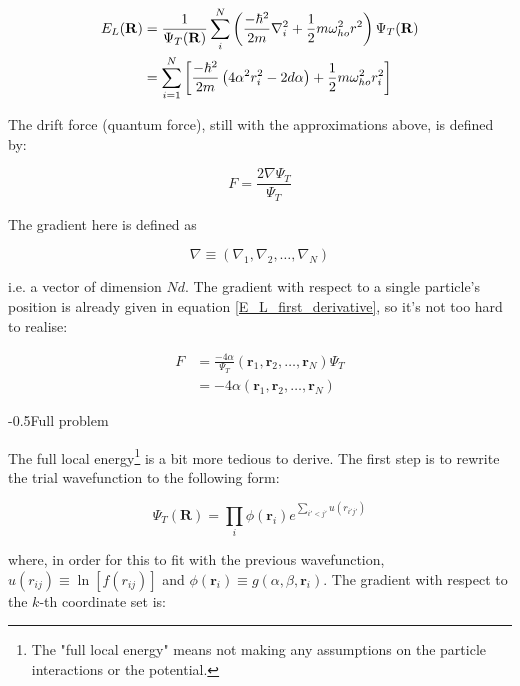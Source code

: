 \documentclass[english, a4paper]{article}
\makeatletter
\newcommand\lr[1]{\left(#1\right)}
\renewcommand{\subsubsection}{\@startsection{subsubsection}{3}{0pt}%
{-\baselineskip}{0.5\baselineskip}{\bf\large}}
\newcommand{\bm}[1]{\mathbf{#1}}
\makeatother
\begin{document}
\begin{align}
\begin{split}
 E_L({\bf R}) &= \frac{1}{\Psi_T({\bf R})}\sum_i^N \lr{
	 \frac{-\hbar^2}{2m}
	 \nabla_{i}^2 +
	\frac{1}{2}m\omega_{ho}^2r^2}\Psi_T({\bf R})\\
    &= \sum_{i=1}^N\left[\frac{-\hbar^2}{2m}\lr{4\alpha^2 r_i^2 - 2d\alpha} + \frac{1}{2}m\omega_{ho}^2r_i^2\right] \label{SimpleLocalEnergies}
\end{split}
\end{align}



The drift force (quantum force), still with the approximations above, is defined by:

\begin{equation}
	F = \frac{2\nabla\Psi_T}{\Psi_T}
\end{equation}

The gradient here is defined as

\begin{equation*}
	\nabla \equiv \lr{\nabla_1,\nabla_2,\ldots,\nabla_N}
\end{equation*}

i.e. a vector of dimension $Nd$. The gradient with respect to a single particle's position is already given in equation \ref{E_L_first_derivative}, so it's not too hard to realise:

\begin{align*}
	F &= \frac{-4\alpha}{\Psi_T}\lr{\bm{r}_1,\bm{r}_2,\ldots,\bm{r}_N}\Psi_T\\
	&= -4\alpha\lr{\bm{r}_1,\bm{r}_2,\ldots,\bm{r}_N}
\end{align*}


\subsubsection{Full problem}

The full local energy\footnote{The "full local energy" means not making any assumptions on the particle interactions or the potential.} is a bit more tedious to derive. The first step is to rewrite the trial wavefunction to the following form:

\begin{equation}
	\Psi_T(\bm{R}) = \prod_{i} \phi(\bm{r}_i)e^{\sum_{i'<j'}u(r_{i'j'})}
\end{equation}

where, in order for this to fit with the previous wavefunction, $u(r_{ij}) \equiv \ln[f(r_{ij})]$ and $\phi(\bm{r}_i) \equiv g(\alpha,\beta,\bm{r}_i)$. The gradient with respect to the $k$-th coordinate set is:
\end{document}
